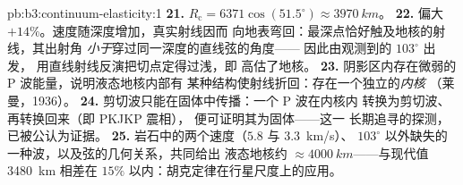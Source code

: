 \begin{solution}{pb:b3:continuum-elasticity:1}
\textbf{21.} $R_{\text{c}} = 6371\cos(51.5^\circ) \approx
\qty{3970}{km}$。
\textbf{22.} 偏大 $+14\%$。速度随深度增加，真实射线因而
向地表弯回：最深点恰好触及地核的射线，其出射角
\emph{小于}穿过同一深度的直线弦的角度——
因此由观测到的 $103^\circ$ 出发，
用直线射线反演把切点定得过浅，即
高估了地核。
\textbf{23.} 阴影区内存在微弱的 P 波能量，说明液态地核内部有
某种结构使射线折回：存在一个独立的\emph{内核}
（莱曼，1936）。
\textbf{24.} 剪切波只能在固体中传播：一个 P 波在内核内
转换为剪切波、再转换回来（即 PKJKP 震相），
便可证明其为固体——这一
长期追寻的探测，已被公认为证据。
\textbf{25.} 岩石中的两个速度（$5.8$ 与 \qty{3.3}{km/s}）、
$103^\circ$ 以外缺失的一种波，以及弦的几何关系，共同给出
液态地核约 $\approx\qty{4000}{km}$——与现代值
\qty{3480}{km} 相差在 $15\%$ 以内：胡克定律在行星尺度上的应用。
\end{solution}
